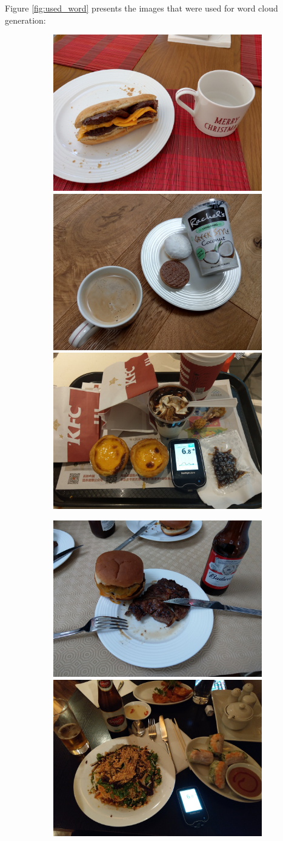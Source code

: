     Figure \ref{fig:used_word} presents the images that were used for word cloud generation:
    
   


    \begin{figure}[H]
      \begin{subfigure}{\linewidth}
      \includegraphics[width=.3\linewidth]{Sections/4InitialWork/4_images_wordcloud/photo1.jpg}\hfill
      \includegraphics[width=.3\linewidth]{Sections/4InitialWork/4_images_wordcloud/photo2.jpg}\hfill
      \includegraphics[width=.3\linewidth]{Sections/4InitialWork/4_images_wordcloud/photo7.jpg}
      \end{subfigure}\par\medskip
      \begin{subfigure}{\linewidth}
      \includegraphics[width=.3\linewidth]{Sections/4InitialWork/4_images_wordcloud/photo4.jpg}\hfill
      \includegraphics[width=.3\linewidth]{Sections/4InitialWork/4_images_wordcloud/photo5.jpg}\hfill

\end{subfigure}
\end{figure}
